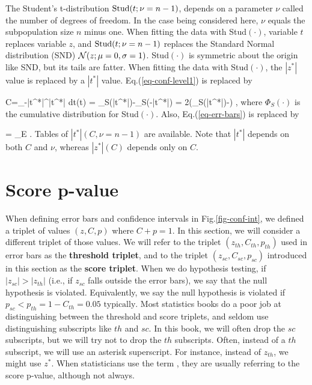 The {\rm Student's t-distribution } ${\rm Stud}(t;
\nu=n-1)$,
depends
on a parameter $\nu$
called the
number of
degrees of freedom.
In the case being considered here,
$\nu$ equals the
subpopulation size $n$
minus one.
When fitting
the data with
Stud$(\cdot)$, variable
$t$ replaces
variable $z$,
and ${\rm Stud}(t; \nu=n-1)$
replaces the Standard Normal distribution (SND)
${\cal N}(z; \mu=0, \sigma=1)$.
Stud$(\cdot)$ is symmetric about
the origin like SND,
but its tails
are fatter.
When fitting the data with Stud$(\cdot)$,
the $|z^*|$
value is replaced
by a $|t^*|$ value.
Eq.(\ref{eq-conf-level1})
is replaced by


\beq
C=\int_{-|t^*|}^{|t^*|} dt(t) =
\Phi_S(|t^*|)-\Phi_S(-|t^*|)
=
2\left(\Phi_S(|t^*|)-\;\right)
\label{eq-conf-level1-stu}
\;,
\eeq
where $\Phi_S(\cdot)$
is the cumulative
distribution for  Stud$(\cdot)$.
Also, Eq.(\ref{eq-err-bars})
is replaced  by

\beq
{} =
 \pm
{}_{E}
\;.
\eeq
Tables of $|t^*|(C,\nu=n-1)$
are available. Note
that $|t^*|$
depends on both $C$ and $\nu$,
whereas $|z^*|(C)$
depends only on $C$.

\section{Score p-value}
\label{sec-score-p-value}
When defining error bars
and confidence intervals in
Fig.\ref{fig-conf-int},
we defined a triplet
of values $(z, C, p)$
where $C+p=1$.
In this section,
we will consider a different triplet
of those values.
We will refer to the triplet
$(z_{th}, C_{th}, p_{th})$
used in error bars as the {\bf threshold triplet}, and to
the triplet
$(z_{sc}, C_{sc}, p_{sc})$
introduced in this section as the
{\bf score triplet}.
When we do hypothesis testing,
if $|z_{sc}|> |z_{th}|$
(i.e., if $z_{sc}$
falls outside
the error bars),
we say that the null
hypothesis is violated.
Equivalently, we say the null
hypothesis is violated
if $p_{sc}<p_{th}=1-C_{th}=0.05 \text{ typically}$.
Most statistics
books do a poor job
at distinguishing between
the threshold and score
triplets, and
seldom use distinguishing
subscripts like $th$ and $sc$.
In this book,
we will often
drop the $sc$
subscripts, but we will
try not to drop the $th$ subscripts.
Often, instead of
a $th$
subscript, we will
use an asterisk superscript.
For instance, instead
of $z_{th}$,
we might use $z^*$.
W\label{key}hen statisticians
use the term
,
they are usually referring to
the score p-value,
although not always.



